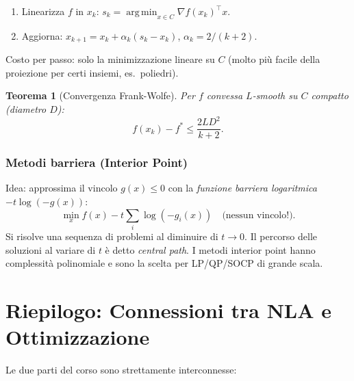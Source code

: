 \documentclass[11pt, a4paper, twoside]{book}
\theoremstyle{definition}
\theoremstyle{plain}
\newtheorem{thm}{Teorema}[chapter]
\theoremstyle{remark}
\DeclareMathOperator*{\argmin}{arg\,min}
\begin{document}
\begin{algobox}
\begin{enumerate}
  \item Linearizza $f$ in $x_k$: $s_k = \argmin_{x \in C} \nabla f(x_k)^\top x$.
  \item Aggiorna: $x_{k+1} = x_k + \alpha_k (s_k - x_k)$, $\alpha_k = 2/(k+2)$.
\end{enumerate}
Costo per passo: solo la minimizzazione lineare su $C$ (molto più facile della proiezione per certi insiemi, es.\ poliedri).
\end{algobox}

\begin{thm}[Convergenza Frank-Wolfe]
Per $f$ convessa $L$-smooth su $C$ compatto (diametro $D$):
\[
  f(x_k) - f^* \leq \frac{2LD^2}{k+2}.
\]
\end{thm}

\subsection{Metodi barriera (Interior Point)}

Idea: approssima il vincolo $g(x) \leq 0$ con la \emph{funzione barriera logaritmica} $-t\log(-g(x))$:
\[
  \min_x f(x) - t \sum_i \log(-g_i(x)) \quad \text{(nessun vincolo!)}.
\]
Si risolve una sequenza di problemi al diminuire di $t \to 0$. Il percorso delle soluzioni al variare di $t$ è detto \emph{central path}. I metodi interior point hanno complessità polinomiale e sono la scelta per LP/QP/SOCP di grande scala.



\chapter{Riepilogo: Connessioni tra NLA e Ottimizzazione}

Le due parti del corso sono strettamente interconnesse:
\end{document}
